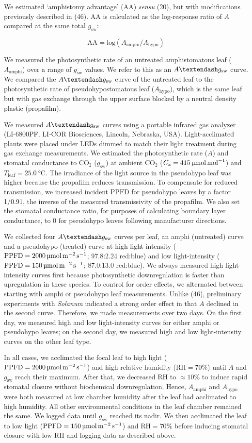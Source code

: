 \documentclass[
  letterpaper,
  DIV=11,
  numbers=noendperiod]{scrartcl}
\newcommand{\aax}{$\mathrm{AA}$}
\newcommand{\Aamphi}{$A_{\mathrm{amphi}}$}
\newcommand{\Ahypo}{$A_{\mathrm{hypo}}$}
\newcommand{\agcurve}{$A \textendash g_\text{sw}$}
\newcommand{\caequals}[1]{$C_\mathrm{a} = \qty{#1}{\micro\mol\raiseto{-1}\mol}$}
\newcommand{\gsw}{$g_\text{sw}$}
\newcommand{\ppfd}{$\mathrm{PPFD}$}
\newcommand{\ppfdequals}[1]{$\mathrm{PPFD} = \qty{#1}{\micro\mol\raiseto{-2}\meter\raiseto{-1}\second}$}
\newcommand{\rh}{$\mathrm{RH}$}
\newcommand{\rhequals}[1]{$\mathrm{RH} = #1\%$}
\newcommand{\tleafequals}[1]{$T_\mathrm{leaf} = \qty{#1}{\degreeCelsius}$}
\begin{document}
We estimated `amphistomy advantage' (\aax) \emph{sensu} (20), but with
modifications previously described in (46). \aax{} is calculated as the
log-response ratio of \(A\) compared at the same total \gsw:

\[\mathrm{AA} = \mathrm{log}(A_{\mathrm{amphi}} / A_{\mathrm{hypo}})\]

We measured the photosynthetic rate of an untreated amphistomatous leaf
(\Aamphi) over a range of \gsw{} values. We refer to this as an
\agcurve{} curve. We compared the \agcurve{} curve of the untreated leaf
to the photosynthetic rate of pseudohypostomatous leaf (\Ahypo), which
is the same leaf but with gas exchange through the upper surface blocked
by a neutral density plastic (propafilm).

We measured \agcurve{} curves using a portable infrared gas analyzer
(LI-6800PF, LI-COR Biosciences, Lincoln, Nebraska, USA).
Light-acclimated plants were placed under LEDs dimmed to match their
light treatment during gas exchange measurements. We estimated the
photosynthetic rate (\(A\)) and stomatal conductance to CO\(_2\) (\gsw)
at ambient CO\(_2\) (\caequals{415}) and \tleafequals{25.0}. The
irradiance of the light source in the pseudohypo leaf was higher because
the propafilm reduces transmission. To compensate for reduced
transmission, we increased incident \ppfd{} for pseudohypo leaves by a
factor 1/0.91, the inverse of the measured transmissivity of the
propafilm. We also set the stomatal conductance ratio, for purposes of
calculating boundary layer conductance, to 0 for pseudohypo leaves
following manufacturer directions.

We collected four \agcurve{} curves per leaf, an amphi (untreated) curve
and a pseudohypo (treated) curve at high light-intensity
(\ppfdequals{2000}; 97.8:2.24 red:blue) and low light-intensity
(\ppfdequals{150}; 87.0:13.0 red:blue). We always measured high
light-intensity curves first because photosynthetic downregulation is
faster than upregulation in these species. To control for order effects,
we alternated between starting with amphi or pseudohypo leaf
measurements. Unlike (46), preliminary experiments with \emph{Solanum}
indicated a strong order effect in that \(A\) declined in the second
curve. Therefore, we made measurements over two days. On the first day,
we measured high and low light-intensity curves for either amphi or
pseudohypo leaves; on the second day, we measured high and low
light-intensity curves on the other leaf type.

In all cases, we acclimated the focal leaf to high light
(\ppfdequals{2000}) and high relative humidity (\rhequals{70}) until
\(A\) and \gsw{} reach their maximum. After that, we decreased \rh{} to
\(\approx 10\%\) to induce rapid stomatal closure without biochemical
downregulation. Hence, \Aamphi{} and \Ahypo{} were both measured at low
chamber humidity after the leaf had acclimated to high humidity. All
other environmental conditions in the leaf chamber remained the same. We
logged data until \gsw{} reached its nadir. We then acclimated the leaf
to low light (\ppfdequals{150}) and \rhequals{70} before inducing
stomatal closure with low \rh{} and logging data as described above.
\end{document}
